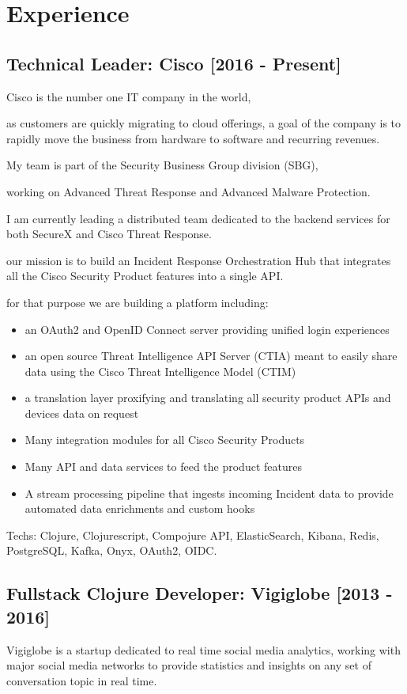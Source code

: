 \documentclass{article}
\begin{document}
\section*{Experience}
\subsection*{Technical Leader: Cisco [2016 - Present]}
Cisco is the number one IT company in the world,

as customers are quickly migrating to cloud offerings,
a goal of the company is to rapidly move the business from hardware to software and recurring revenues.

My team is part of the Security Business Group division (SBG),

working on Advanced Threat Response and Advanced Malware Protection.

I am currently leading a distributed team dedicated to the backend services for both SecureX and Cisco Threat Response.

our mission is to build an Incident Response Orchestration Hub that integrates all the Cisco Security Product features into a single API.

for that purpose we are building a platform including:


\begin{itemize}
\item an OAuth2 and OpenID Connect server providing unified login experiences
\item an open source Threat Intelligence API Server (CTIA) meant to easily share data using the Cisco Threat Intelligence Model (CTIM)
\item a translation layer proxifying and translating all security product APIs and devices data on request
\item Many integration modules for all Cisco Security Products
\item Many API and data services to feed the product features
\item A stream processing pipeline that ingests incoming Incident data to provide automated data enrichments and custom hooks
\end{itemize}
Techs: Clojure, Clojurescript, Compojure API, ElasticSearch, Kibana, Redis, PostgreSQL, Kafka, Onyx, OAuth2, OIDC.

\subsection*{Fullstack Clojure Developer: Vigiglobe [2013 - 2016]}
Vigiglobe is a startup dedicated to real time social media analytics, working with major social media networks to provide statistics and insights
on any set of conversation topic in real time.
\end{document}
